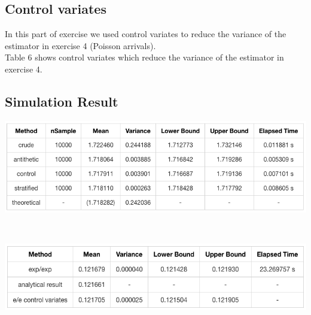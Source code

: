 \subsection{Control variates}

In this part of exercise we used control variates to reduce the variance of the estimator in exercise 4 (Poisson arrivals).\\
Table 6 shows control variates which reduce the variance of the estimator in exercise 4.

\subsection{Simulation Result}

\begin{center}
    \includegraphics[scale=0.55]{Figures/figure5_1.png}\\
\end{center}\\

\begin{center}
    \includegraphics[scale=0.55]{Figures/figure5_2.png}\\
\end{center}\\